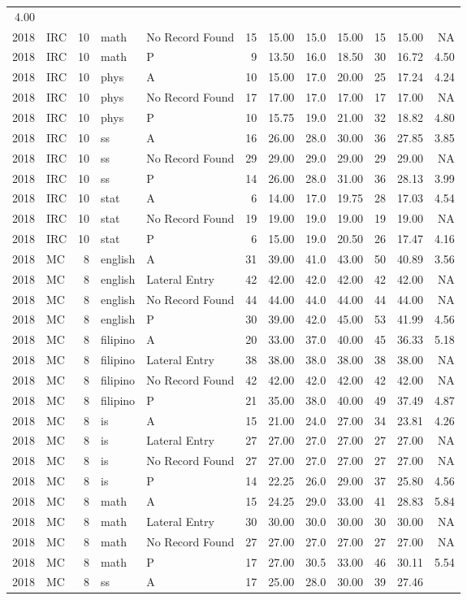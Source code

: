 \documentclass[]{article}
\begin{document}
\begin{longtable}[]{@{}rlrllrrrrrrr@{}}
4.00\tabularnewline
2018 & IRC & 10 & math & No Record Found & 15 & 15.00 & 15.0 & 15.00 &
15 & 15.00 & NA\tabularnewline
2018 & IRC & 10 & math & P & 9 & 13.50 & 16.0 & 18.50 & 30 & 16.72 &
4.50\tabularnewline
2018 & IRC & 10 & phys & A & 10 & 15.00 & 17.0 & 20.00 & 25 & 17.24 &
4.24\tabularnewline
2018 & IRC & 10 & phys & No Record Found & 17 & 17.00 & 17.0 & 17.00 &
17 & 17.00 & NA\tabularnewline
2018 & IRC & 10 & phys & P & 10 & 15.75 & 19.0 & 21.00 & 32 & 18.82 &
4.80\tabularnewline
2018 & IRC & 10 & ss & A & 16 & 26.00 & 28.0 & 30.00 & 36 & 27.85 &
3.85\tabularnewline
2018 & IRC & 10 & ss & No Record Found & 29 & 29.00 & 29.0 & 29.00 & 29
& 29.00 & NA\tabularnewline
2018 & IRC & 10 & ss & P & 14 & 26.00 & 28.0 & 31.00 & 36 & 28.13 &
3.99\tabularnewline
2018 & IRC & 10 & stat & A & 6 & 14.00 & 17.0 & 19.75 & 28 & 17.03 &
4.54\tabularnewline
2018 & IRC & 10 & stat & No Record Found & 19 & 19.00 & 19.0 & 19.00 &
19 & 19.00 & NA\tabularnewline
2018 & IRC & 10 & stat & P & 6 & 15.00 & 19.0 & 20.50 & 26 & 17.47 &
4.16\tabularnewline
2018 & MC & 8 & english & A & 31 & 39.00 & 41.0 & 43.00 & 50 & 40.89 &
3.56\tabularnewline
2018 & MC & 8 & english & Lateral Entry & 42 & 42.00 & 42.0 & 42.00 & 42
& 42.00 & NA\tabularnewline
2018 & MC & 8 & english & No Record Found & 44 & 44.00 & 44.0 & 44.00 &
44 & 44.00 & NA\tabularnewline
2018 & MC & 8 & english & P & 30 & 39.00 & 42.0 & 45.00 & 53 & 41.99 &
4.56\tabularnewline
2018 & MC & 8 & filipino & A & 20 & 33.00 & 37.0 & 40.00 & 45 & 36.33 &
5.18\tabularnewline
2018 & MC & 8 & filipino & Lateral Entry & 38 & 38.00 & 38.0 & 38.00 &
38 & 38.00 & NA\tabularnewline
2018 & MC & 8 & filipino & No Record Found & 42 & 42.00 & 42.0 & 42.00 &
42 & 42.00 & NA\tabularnewline
2018 & MC & 8 & filipino & P & 21 & 35.00 & 38.0 & 40.00 & 49 & 37.49 &
4.87\tabularnewline
2018 & MC & 8 & is & A & 15 & 21.00 & 24.0 & 27.00 & 34 & 23.81 &
4.26\tabularnewline
2018 & MC & 8 & is & Lateral Entry & 27 & 27.00 & 27.0 & 27.00 & 27 &
27.00 & NA\tabularnewline
2018 & MC & 8 & is & No Record Found & 27 & 27.00 & 27.0 & 27.00 & 27 &
27.00 & NA\tabularnewline
2018 & MC & 8 & is & P & 14 & 22.25 & 26.0 & 29.00 & 37 & 25.80 &
4.56\tabularnewline
2018 & MC & 8 & math & A & 15 & 24.25 & 29.0 & 33.00 & 41 & 28.83 &
5.84\tabularnewline
2018 & MC & 8 & math & Lateral Entry & 30 & 30.00 & 30.0 & 30.00 & 30 &
30.00 & NA\tabularnewline
2018 & MC & 8 & math & No Record Found & 27 & 27.00 & 27.0 & 27.00 & 27
& 27.00 & NA\tabularnewline
2018 & MC & 8 & math & P & 17 & 27.00 & 30.5 & 33.00 & 46 & 30.11 &
5.54\tabularnewline
2018 & MC & 8 & ss & A & 17 & 25.00 & 28.0 & 30.00 & 39 & 27.46 &

\end{longtable}
\end{document}
